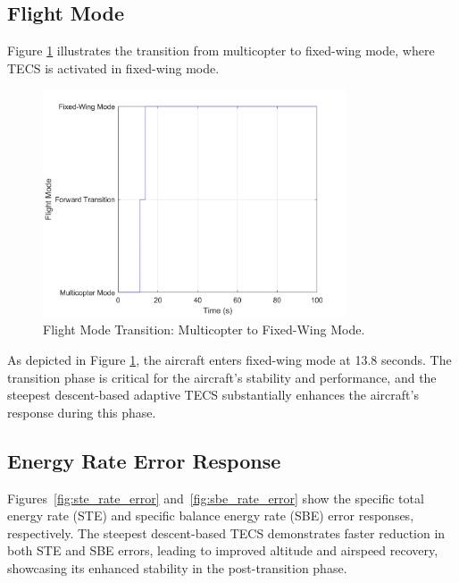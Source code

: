 \documentclass[journal,article,submit,pdftex,moreauthors]{Definitions/mdpi}
\begin{document}
\subsection{Flight Mode}
Figure \ref{fig:flight_state} illustrates the transition from multicopter to fixed-wing mode, where TECS is activated in fixed-wing mode.

\begin{figure}[H]
    \centering
    \includegraphics[width=0.8\textwidth]{figures/flight_state_plot.png}
    \caption{Flight Mode Transition: Multicopter to Fixed-Wing Mode.}
    \label{fig:flight_state}
\end{figure}

As depicted in Figure \ref{fig:flight_state}, the aircraft enters fixed-wing mode at 13.8 seconds. The transition phase is critical for the aircraft's stability and performance, and the steepest descent-based adaptive TECS substantially enhances the aircraft's response during this phase.

\subsection{Energy Rate Error Response}
Figures~\ref{fig:ste_rate_error} and~\ref{fig:sbe_rate_error} show the specific total energy rate (STE) and specific balance energy rate (SBE) error responses, respectively. The steepest descent-based TECS demonstrates faster reduction in both STE and SBE errors, leading to improved altitude and airspeed recovery, showcasing its enhanced stability in the post-transition phase.
\end{document}
